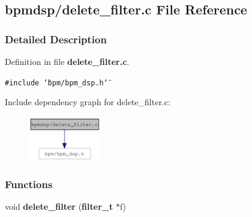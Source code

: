 \subsection{bpmdsp/delete\_\-filter.c File Reference}
\label{delete__filter_8c}


\subsubsection{Detailed Description}


Definition in file {\bf delete\_\-filter.c}.

{\tt \#include \char`\"{}bpm/bpm\_\-dsp.h\char`\"{}}\par


Include dependency graph for delete\_\-filter.c:\nopagebreak
\begin{figure}[H]
\begin{center}
\leavevmode
\includegraphics[width=89pt]{delete__filter_8c__incl}
\end{center}
\end{figure}
\subsubsection*{Functions}
\begin{CompactItemize}
\item 
void {\bf delete\_\-filter} ({\bf filter\_\-t} $\ast$f)
\end{CompactItemize}
